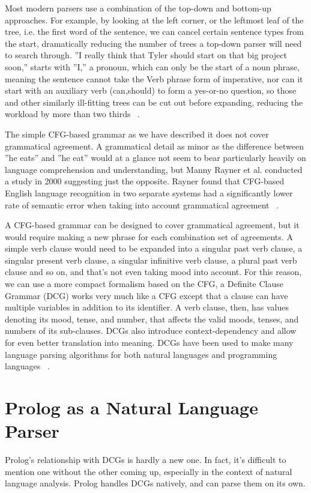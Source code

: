 \documentclass[12pt]{article}
\begin{document}
Most modern parsers use a combination of the top-down and bottom-up approaches. For example, by looking at the left corner, or the leftmost leaf of the tree, i.e. the first word of the sentence, we can cancel certain sentence types from the start, dramatically reducing the number of trees a top-down parser will need to search through. ''I really think that Tyler should start on that big project soon,'' starts with ''I,'' a pronoun, which can only be the start of a noun phrase, meaning the sentence cannot take the Verb phrase form of imperative, nor can it start with an auxiliary verb (can,should) to form a yes-or-no question, so those and other similarly ill-fitting trees can be cut out before expanding, reducing the workload by more than two thirds ~\citep{Jurafsky}.

The simple CFG-based grammar as we have described it does not cover grammatical agreement. A grammatical detail as minor as the difference between ''he eats'' and ''he eat'' would at a glance not seem to bear particularly heavily on language comprehension and understanding, but Manny Rayner et al. conducted a study in 2000 suggesting just the opposite. Rayner found that CFG-based English language recognition in two separate systems had a significantly lower rate of semantic error when taking into account grammatical agreement ~\citep{Rayner}.

A CFG-based grammar can be designed to cover grammatical agreement, but it would require making a new phrase for each combination set of agreements. A simple verb clause would need to be expanded into a singular past verb clause, a singular present verb clause, a singular infinitive verb clause, a plural past verb clause and so on, and that's not even taking mood into account. For this reason, we can use a more compact formalism based on the CFG, a Definite Clause Grammar (DCG) works very much like a CFG except that a clause can have multiple variables in addition to its identifier. A verb clause, then, has values denoting its mood, tense, and number, that affects the valid moods, tenses, and numbers of its sub-clauses. DCGs also introduce context-dependency and allow for even better translation into meaning. DCGs have been used to make many language parsing algorithms for both natural languages and programming languages ~\citep{DCGNLA}.

\section*{Prolog as a Natural Language Parser}

Prolog's relationship with DCGs is hardly a new one. In fact, it's difficult to mention one without the other coming up, especially in the context of natural language analysis. Prolog handles DCGs natively, and can parse them on its own.

\singlespacing
{}

\end{document}
